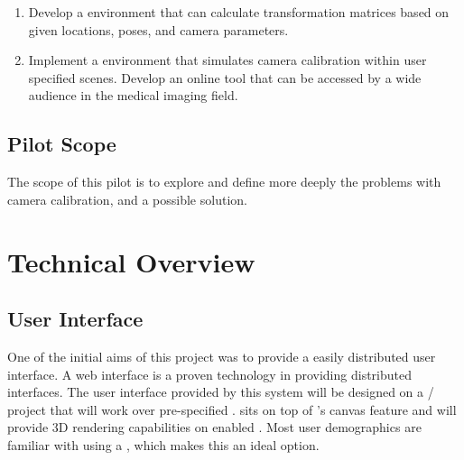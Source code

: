 \documentclass[11pt]{report}
\begin{document}
\begin{enumerate}
\item Develop a  environment that can calculate transformation matrices based on given locations, poses, and camera parameters.  
\item Implement a  environment that simulates camera calibration within user specified scenes. Develop an online tool that can be accessed by a wide audience in the medical imaging field.
\end{enumerate}

\subsection{Pilot Scope}
The scope of this pilot is to explore and define more deeply the problems with camera calibration, and a possible solution.  

\section{Technical Overview}

\subsection{User Interface}




One of the initial aims of this project was to provide a easily distributed user interface. A web interface is a proven technology in providing distributed interfaces. The user interface provided by this system will be designed on a / project that will work over pre-specified .  sits on top of 's canvas feature and will provide 3D rendering capabilities on enabled . Most user demographics are familiar with using a , which makes this an ideal option. 
\end{document}
